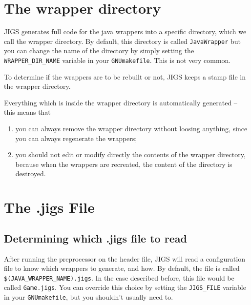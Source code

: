 \section{The wrapper directory}
JIGS generates full code for the java wrappers into a specific
directory, which we call the wrapper directory.  By default, this
directory is called \texttt{JavaWrapper} but you can change the name
of the directory by simply setting the \texttt{WRAPPER\_DIR\_NAME}
variable in your \texttt{GNUmakefile}.  This is not very common.

To determine if the wrappers are to be rebuilt or not, JIGS keeps a
stamp file in the wrapper directory.

Everything which is inside the wrapper directory is automatically
generated -- this means that
\begin{enumerate}
\item you can always remove the wrapper directory without loosing anything, 
since you can always regenerate the wrappers;
\item you should not edit or modify directly the contents of the wrapper 
directory, because when the wrappers are recreated, the content of the 
directory is destroyed.
\end{enumerate}

\section{The .jigs File}

\subsection{Determining which .jigs file to read}
After running the preprocessor on the header file, JIGS will read a
configuration file to know which wrappers to generate, and how.  By
default, the file is called \texttt{\$(JAVA\_WRAPPER\_NAME).jigs}.  In
the case described before, this file would be called
\texttt{Game.jigs}.  You can override this choice by setting the
\texttt{JIGS\_FILE} variable in your \texttt{GNUmakefile}, but you
shouldn't usually need to.

